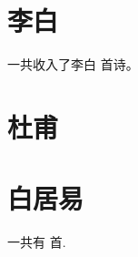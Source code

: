 \documentclass[twocolumn]{ctexart}
\newcommand{\二号}{\fontsize{21pt}{\baselineskip}\selectfont}%
\newcommand{\三号}{\fontsize{15.75pt}{\baselineskip}\selectfont}
\newcommand{\四号}{\fontsize{14pt}{\baselineskip}\selectfont}
\newcounter{poetrycounterall} %
\newcounter{poetrycounter}[section] %
\newcounter{poetrycountersub}[subsection] %
\begin{document}
\tableofcontents   

\newpage

\clearpage
\section{李白}





\setcounter{libaiqijuecot}{\thepoetrycountersub}

一共收入了李白 \thepoetrycounter  首诗。

\clearpage


\section{杜甫}





\clearpage
\section{白居易}





\clearpage

% 
% 
% 

一共有 \thepoetrycounterall 首.
\end{document}
